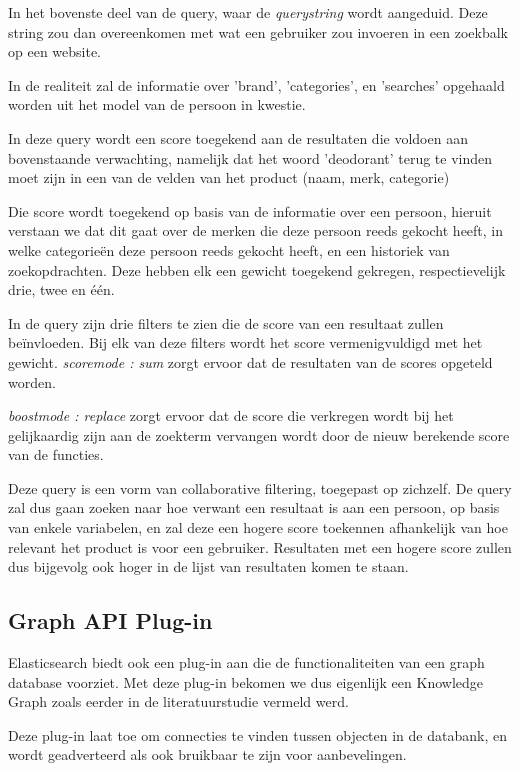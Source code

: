 In het bovenste deel van de query, waar de \textit{query\textunderscore string} wordt aangeduid. Deze string zou dan overeenkomen met wat een gebruiker zou invoeren in een zoekbalk op een website.

In de realiteit zal de informatie over 'brand', 'categories', en 'searches' opgehaald worden uit het model van de persoon in kwestie.

In deze query wordt een score toegekend aan de resultaten die voldoen aan bovenstaande verwachting, namelijk dat het woord 'deodorant' terug te vinden moet zijn in een van de velden van het product (naam, merk, categorie)

Die score wordt toegekend op basis van de informatie over een persoon, hieruit verstaan we dat dit gaat over de merken die deze persoon reeds gekocht heeft, in welke categorieën deze persoon reeds gekocht heeft, en een historiek van zoekopdrachten. Deze hebben elk een gewicht toegekend gekregen, respectievelijk drie, twee en één. 

In de query zijn drie filters te zien die de score van een resultaat zullen beïnvloeden. Bij elk van deze filters wordt het score vermenigvuldigd met het gewicht. \textit{score\textunderscore mode : sum} zorgt ervoor dat de resultaten van de scores opgeteld worden.

\textit{boost\textunderscore mode : replace} zorgt ervoor dat de score die verkregen wordt bij het gelijkaardig zijn aan de zoekterm vervangen wordt door de nieuw berekende score van de functies.

Deze query is een vorm van collaborative filtering, toegepast op zichzelf. De query zal dus gaan zoeken naar hoe verwant een resultaat is aan een persoon, op basis van enkele variabelen, en zal deze een hogere score toekennen afhankelijk van hoe relevant het product is voor een gebruiker. Resultaten met een hogere score zullen dus bijgevolg ook hoger in de lijst van resultaten komen te staan.

\subsection{Graph API Plug-in}
\label{sec:Graph API Plug-in}

Elasticsearch biedt ook een plug-in aan die de functionaliteiten van een graph database voorziet. Met deze plug-in bekomen we dus eigenlijk een Knowledge Graph zoals eerder in de literatuurstudie vermeld werd. 

Deze plug-in laat toe om connecties te vinden tussen objecten in de databank, en wordt geadverteerd als ook bruikbaar te zijn voor aanbevelingen.

